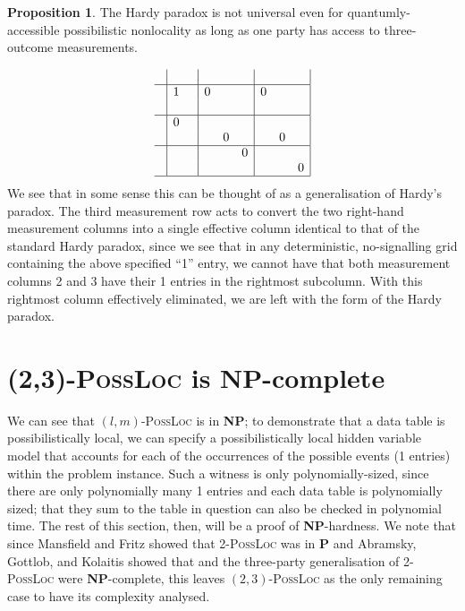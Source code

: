 \documentclass[reprint]{revtex4-1}
\theoremstyle{definition}
\newtheorem{prop}{Proposition}
\begin{document}
\begin{prop}The Hardy paradox is not universal even for quantumly-accessible possibilistic nonlocality as long as one party has access to three-outcome measurements. 
\end{prop}
\begin{equation*}
\begin{array}{ c | c c | c c c| c c c|}
&&&&&&&& \\ \hline
&1&&0&&&0&&\\
   &&&&&&&&\\ \hline
   &0&&&&&&&\\ 
  &&&&0&&&0&\\ \hline
  &&&&&0&&&\\ 
  &&&&&&&&0\\ \hline
\end{array}
\end{equation*}
We see that in some sense this can be thought of as a generalisation of Hardy's paradox. The third measurement row acts to convert the two right-hand measurement columns into a single effective column identical to that of the standard Hardy paradox, since we see that in any deterministic, no-signalling grid containing the above specified ``1'' entry, we cannot have that both measurement columns 2 and 3 have their 1 entries in the rightmost subcolumn. With this rightmost column effectively eliminated, we are left with the form of the Hardy paradox. 


\section{\textsc{(2,3)-PossLoc} is \textbf{NP}-complete}

We can see that $(l,m)$-\textsc{PossLoc} is in \textbf{NP}; to demonstrate that a data table is possibilistically local, we can specify a possibilistically local hidden variable model that accounts for each of the occurrences of the possible events (1 entries) within the problem instance. Such a witness is only polynomially-sized, since there are only polynomially many 1 entries and each data table is polynomially sized; that they sum to the table in question can also be checked in polynomial time. The rest of this section, then, will be a proof of \textbf{NP}-hardness. We note that since Mansfield and Fritz \cite{Mans2011} showed that \textsc{2-PossLoc} was in \textbf{P} and Abramsky, Gottlob, and Kolaitis showed that   and the three-party generalisation of \textsc{2-PossLoc} were \textbf{NP}-complete, this leaves $(2,3)$-\textsc{PossLoc} as the only remaining case to have its complexity analysed.
\end{document}
